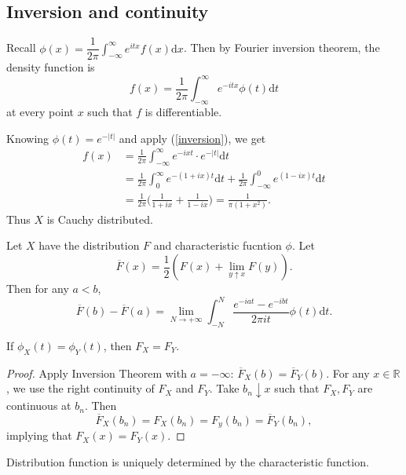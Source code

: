 \documentclass[11pt,singlecolumn, openany, citestyle=authoryear]{elegantbook}
\begin{document}
\begin{CJK}{UTF8}{gbsn}
\section{Inversion and continuity}
Recall $\phi(x)=\displaystyle \dfrac{1}{2\pi}\int_{-\infty}^\infty 
e^{itx}f(x)\mathrm{d}x$. Then by 
Fourier inversion theorem, the density function is 
\begin{equation}\label{inversion}
f(x)=\dfrac{1}{2\pi}\int_{-\infty}^\infty e^{-itx}\phi(t)\mathrm{d}t
\end{equation}
at every point $x$ such that $f$ is differentiable.
\begin{example}
    Knowing $\phi(t)=e^{-|t|}$ and apply (\ref{inversion}), we get 
    \begin{align*}
        f(x)&=\frac{1}{2\pi}\int_{-\infty}^\infty e^{-ixt}\cdot e^{-|t|}\mathrm{d}t\\
        &=\frac{1}{2\pi}\int_0^\infty e^{-(1+ix)t}\mathrm{d}t+\frac{1}{2\pi}\int_{-\infty}^0
        e^{(1-ix)t}\mathrm{d}t\\
        &=\frac{1}{2\pi}\biggl(
            \frac{1}{1+ix}+\frac{1}{1-ix}
        \biggr)=\frac{1}{\pi(1+x^2)}.
    \end{align*}
    Thus $X$ is Cauchy distributed.
\end{example}
\begin{theorem}[Inversion]
    Let $X$ have the distribution $F$ and characteristic fucntion $\phi$. Let 
    $$
    \overline{F}(x)=\frac{1}{2}(F(x)+\lim_{y\uparrow x}F(y)).
    $$
    Then for any $a<b$, 
    $$
    \overline{F}(b)-\overline{F}(a)=\lim_{N\to+\infty} \int_{-N}^N 
    \frac{e^{-iat}-e^{-ibt}}{2\pi i t}\phi(t)\mathrm{d}t.
    $$
\end{theorem}
\begin{corollary}
    If $\phi_X(t)=\phi_Y(t)$, then $F_X=F_Y$.
\end{corollary}
\begin{proof}
    Apply Inversion Theorem with $a=-\infty$: $\overline{F}_X(b)=\overline{F}_Y(b)$.
    For any $x\in\mathbb{R}$, we use the right continuity of $F_X$ and $F_Y$. Take 
    $b_n\downarrow x$ such that $F_X, F_Y$ are continuous at $b_n$. Then 
    $$
    \overline{F}_X(b_n)=F_X(b_n)=F_y(b_n)=\overline{F}_Y(b_n),
    $$
    implying that $F_X(x)=F_Y(x)$.
\end{proof}
\begin{theorem}[Uniqueness]
    Distribution function is uniquely determined by the characteristic function.
\end{theorem}

\end{CJK}
\end{document}
